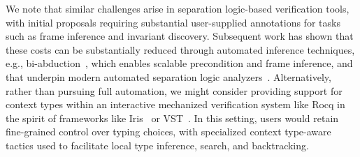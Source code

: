 We note that similar challenges arise in separation logic-based
verification tools, with initial proposals requiring substantial
user-supplied annotations for tasks such as frame inference and
invariant discovery. Subsequent work has shown that these costs can be
substantially reduced through automated inference techniques, e.g.,
bi-abduction~\cite{CD11}, which enables scalable precondition and
frame inference, and that underpin modern automated separation logic
analyzers~\cite{DFLO19}.  
Alternatively, rather than pursuing full automation, we might consider
providing support for context types within an interactive mechanized
verification system like Rocq in the spirit of frameworks like
Iris~\cite{Iris} or VST~\cite{AD+14}.  In this setting, users would
retain fine-grained control over typing choices, with specialized
context type-aware tactics used to facilitate local type inference,
search, and backtracking.





